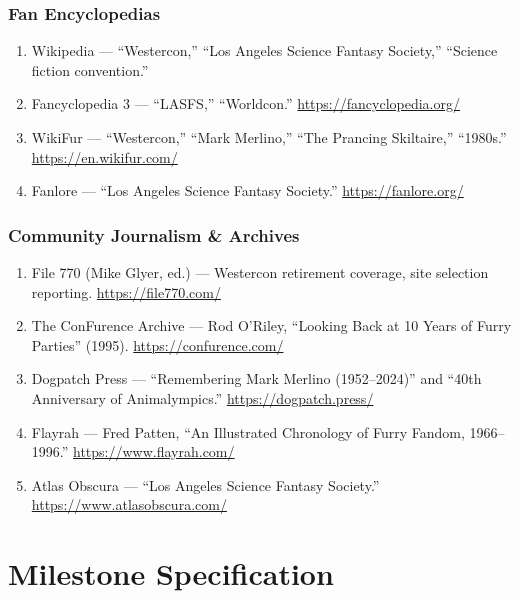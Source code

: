 \documentclass[11pt,letterpaper]{article}
\newcommand{\stageheader}[2]{%
  \noindent\colorbox{#2}{\makebox[\textwidth][l]{%
    \textcolor{white}{\bfseries\sffamily\hspace{6pt}#1\hspace{6pt}}}}%
  \vspace{0.5em}\par%
}
\begin{document}
\subsubsection{Fan Encyclopedias}

\begin{enumerate}[leftmargin=2em, resume]
  \item Wikipedia --- ``Westercon,'' ``Los Angeles Science Fantasy Society,'' ``Science fiction convention.''
  \item Fancyclopedia 3 --- ``LASFS,'' ``Worldcon.'' \url{https://fancyclopedia.org/}
  \item WikiFur --- ``Westercon,'' ``Mark Merlino,'' ``The Prancing Skiltaire,'' ``1980s.'' \url{https://en.wikifur.com/}
  \item Fanlore --- ``Los Angeles Science Fantasy Society.'' \url{https://fanlore.org/}
\end{enumerate}

\subsubsection{Community Journalism \& Archives}

\begin{enumerate}[leftmargin=2em, resume]
  \item File 770 (Mike Glyer, ed.) --- Westercon retirement coverage, site selection reporting. \url{https://file770.com/}
  \item The ConFurence Archive --- Rod O'Riley, ``Looking Back at 10 Years of Furry Parties'' (1995). \url{https://confurence.com/}
  \item Dogpatch Press --- ``Remembering Mark Merlino (1952--2024)'' and ``40th Anniversary of Animalympics.'' \url{https://dogpatch.press/}
  \item Flayrah --- Fred Patten, ``An Illustrated Chronology of Furry Fandom, 1966--1996.'' \url{https://www.flayrah.com/}
  \item Atlas Obscura --- ``Los Angeles Science Fantasy Society.'' \url{https://www.atlasobscura.com/}
\end{enumerate}

\newpage

\stageheader{STAGE 3 --- MISSION PACKAGE}{tertiary}

\section{Milestone Specification}
\end{document}
